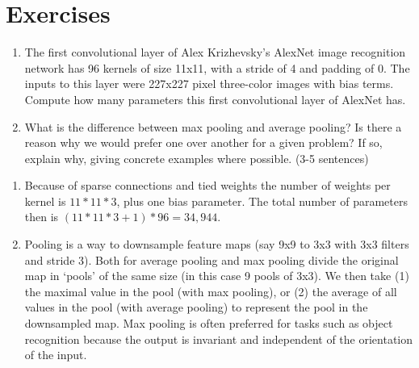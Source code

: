 \def\pathToRoot{.}


\def\issolution{}




\section*{Exercises}

\newcommand{\TODO}[1]{\textcolor{red}{TODO:#1}}

\begin{exercise}

\begin{enumerate}
    
    \item The first convolutional layer of Alex Krizhevsky's AlexNet image recognition network has 96 kernels of size 11x11, with a stride of 4 and padding of 0.  The inputs to this layer were 227x227 pixel three-color images with bias terms.  Compute how many parameters this first convolutional layer of AlexNet has.
    
    \item What is the difference between max pooling and average pooling? Is there a reason why we would prefer one over another for a given problem? If so, explain why, giving concrete examples where possible. (3-5 sentences)
    
\end{enumerate}

\end{exercise}


\begin{solution}
   \begin{enumerate}
       \item Because of sparse connections and tied weights the number of weights per kernel is $11*11*3$, plus one bias parameter. The total number of parameters then is $(11*11*3+1)*96 = 34,944$. 
       \item Pooling is a way to downsample feature maps (say 9x9 to 3x3 with 3x3 filters and stride 3). Both for average pooling and max pooling divide the original map in `pools' of the same size (in this case 9 pools of 3x3). We then take (1) the maximal value in the pool (with max pooling), or (2) the average of all values in the pool (with average pooling) to represent the pool in the downsampled map. Max pooling is often preferred for tasks such as object recognition because the output is invariant and independent of the orientation of the input.
   \end{enumerate}
\end{solution}


